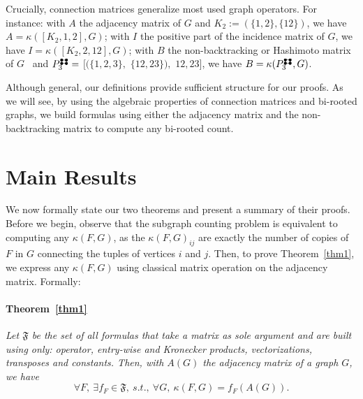 \documentclass{article}
\theoremstyle{plain}
\begin{document}
Crucially, connection matrices generalize most used graph operators. For instance: with $A$ the adjacency matrix of $G$ and $K_2:=(\{1,2\},\{12\})$, we have $A=\kappa([K_2,1,2],G)$; with $I$ the positive part of the incidence matrix of $G$, we have $I = \kappa([K_2,2,12],G)$; with $B$ the non-backtracking or Hashimoto matrix of $G$~\cite{Krzakala13} and $P^{\ddumbbell}_3 =$ $[(\{1,2,3\},$ $\{12,23\}),$ $12, 23]$, we have $B=\kappa(P^{\ddumbbell}_3,G)$.

Although general, our definitions provide sufficient structure for our proofs. As we will see, by using the algebraic properties of connection matrices and bi-rooted graphs, we build formulas using either the adjacency matrix and the non-backtracking matrix to compute any bi-rooted count.

\section{Main Results}\label{Heur}
We now formally state our two theorems and present a summary of their proofs. Before we begin, observe that the subgraph counting problem is equivalent to computing any $\kappa(F,G)$, as the $\kappa(F,G)_{ij}$ are exactly the number of copies of $F$ in $G$ connecting the tuples of vertices $i$ and $j$. Then, to prove Theorem~\ref{thm1}, we express any $\kappa(F,G)$ using classical matrix operation on the adjacency matrix. Formally:
\vspace{-.75\baselineskip}
\paragraph{Theorem~\protect\ref{thm1}}
\emph{Let $\mathfrak{F}$ be the set of all formulas that take a matrix as sole argument and are built using only: operator, entry-wise and Kronecker products, vectorizations, transposes and constants. Then, with $A(G)$ the adjacency matrix of a graph $G$, we have}
\vspace{-.2\baselineskip}\begin{equation}\label{e1}
\forall F,\ \exists f_F\in\mathfrak{F},\ s.t.,\ \forall G,\ \kappa(F,G)=f_F(A(G)).
\end{equation}
\end{document}
